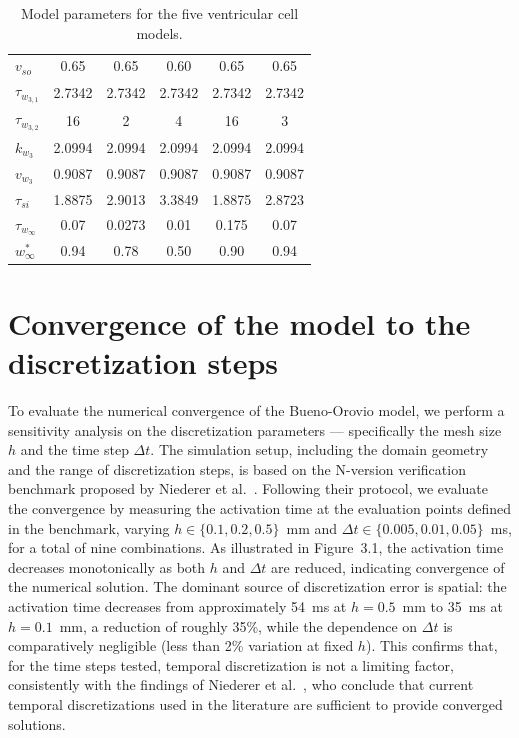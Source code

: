 \documentclass{Configuration_Files/PoliMi3i_thesis}
\begin{document}
\begin{table}[ht]
\begin{tabular}{lccccc}
$v_{so}$            & 0.65   & 0.65   & 0.60   & 0.65   & 0.65   \\
$\tau_{w_{3,1}}$       & 2.7342 & 2.7342 & 2.7342 & 2.7342 & 2.7342 \\
$\tau_{w_{3,2}}$       & 16     & 2      & 4      & 16     & 3      \\
$k_{w_3}$             & 2.0994 & 2.0994 & 2.0994 & 2.0994 & 2.0994 \\
$v_{w_3}$             & 0.9087 & 0.9087 & 0.9087 & 0.9087 & 0.9087 \\
$\tau_{si}$       & 1.8875 & 2.9013 & 3.3849 & 1.8875 & 2.8723 \\
$\tau_{w_\infty}$     & 0.07   & 0.0273 & 0.01   & 0.175  & 0.07   \\
$w_\infty^{*}$        & 0.94   & 0.78   & 0.50   & 0.90   & 0.94   \\
\bottomrule
\end{tabular}
\caption{Model parameters for the five ventricular cell models.}
\label{tab:model_parameters}
\end{table}
\FloatBarrier
\section{Convergence of the model to the discretization steps}
To evaluate the numerical convergence of the Bueno-Orovio model, we perform a
sensitivity analysis on the discretization parameters --- specifically the mesh size $h$
and the time step $\Delta t$. The simulation setup, including the domain geometry and
the range of discretization steps, is based on the N-version verification benchmark
proposed by Niederer et al.~\cite{niederer2011}. Following their protocol, we evaluate
the convergence by measuring the activation time at the evaluation points defined in
the benchmark, varying $h \in \{0.1, 0.2, 0.5\}$~mm and
$\Delta t \in \{0.005, 0.01, 0.05\}$~ms, for a total of nine combinations. 
As illustrated in Figure~3.1, the activation time decreases monotonically as both
$h$ and $\Delta t$ are reduced, indicating convergence of the numerical solution.
The dominant source of discretization error is spatial: the activation time decreases
from approximately 54~ms at $h = 0.5$~mm to 35~ms at $h = 0.1$~mm, a reduction
of roughly 35\%, while the dependence on $\Delta t$ is comparatively negligible
(less than 2\% variation at fixed $h$). This confirms that, for the time steps tested,
temporal discretization is not a limiting factor, consistently with the findings of
Niederer et al.~\cite{niederer2011}, who conclude that current temporal
discretizations used in the literature are sufficient to provide converged solutions.
\end{document}
